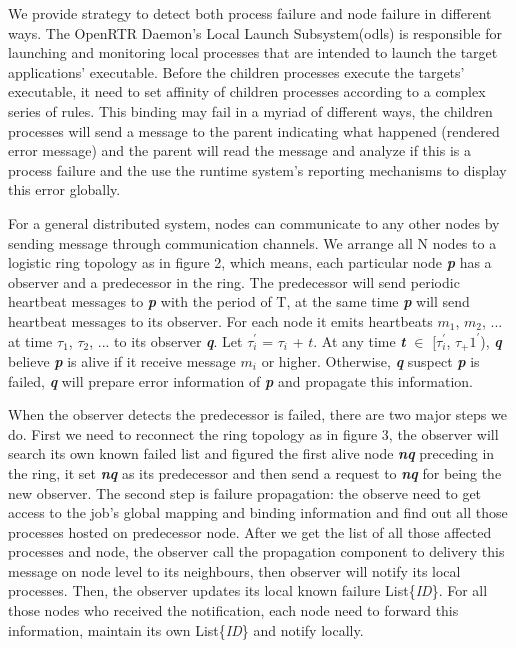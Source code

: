 \documentclass[sigconf]{acmart}
\begin{document}
We provide strategy to detect both process failure and node failure in different ways. The OpenRTR Daemon's Local Launch Subsystem(odls) is responsible for launching and monitoring local processes that are intended to launch the target applications' executable. Before the children processes execute the targets' executable, it need to set affinity of children processes according to a complex series of rules. This binding may fail in a myriad of different ways, the children processes will send a message to the parent indicating what happened (rendered error message) and the parent will read the message and analyze if this is a process failure and the use the runtime system's reporting mechanisms to display this error globally. 

For a general distributed system, nodes can communicate to any other nodes by sending message through communication channels. We arrange all N nodes to a logistic ring topology as in figure 2, which means, each particular node \textbf{\textit{p}} has a observer and a predecessor in the ring. The predecessor will send periodic heartbeat messages to \textbf{\textit{p}} with the period of T, at the same time \textbf{\textit{p}} will send heartbeat messages to its observer. For each node it emits heartbeats $m_1$, $m_2$, ... at time ${\tau_1}$, ${\tau_2}$, ... to its observer \textbf{\textit{q}}. Let ${\tau_i^'}$ = ${\tau_i}$ + $t$. At any time \textbf{\textit{t}} $\in$ [${\tau_i^'}$, ${\tau_+1^'}$), \textbf{\textit{q}} believe \textbf{\textit{p}} is alive if it receive message $m_i$ or higher. Otherwise, \textbf{\textit{q}} suspect \textbf{\textit{p}} is failed, \textbf{\textit{q}} will prepare error information of \textbf{\textit{p}} and propagate this information. 

When the observer detects the predecessor is failed, there are two major steps we do. First we need to reconnect the ring topology as in figure 3, the observer will search its own known failed list and figured the first alive node \textbf{\textit{nq}} preceding in the ring, it set \textbf{\textit{nq}} as its predecessor and then send a request to \textbf{\textit{nq}} for being the new observer. The second step is failure propagation: the observe need to get access to the job's global mapping and binding information and find out all those processes hosted on predecessor node. After we get the list of all those affected processes and node, the observer call the propagation component to delivery this message on node level to its neighbours, then observer will notify its local processes. Then, the observer updates its local known failure List\{\textit{ID}\}. For all those nodes who received the notification, each node need to forward this information, maintain its own List\{\textit{ID}\} and notify locally. 
\end{document}

